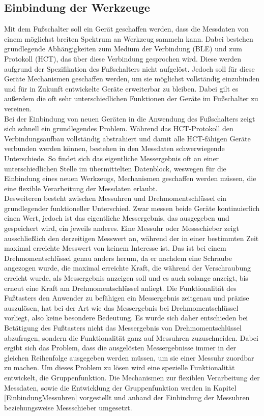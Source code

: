\subsection{Einbindung der Werkzeuge}
Mit dem Fußschalter soll ein Gerät geschaffen werden, dass die Messdaten von einem möglichst breiten Spektrum an Werkzeug sammeln kann. Dabei bestehen grundlegende Abhängigkeiten zum Medium der Verbindung (\ac{BLE}) und zum Protokoll (\ac{HCT}), das über diese Verbindung gesprochen wird. Diese werden aufgrund der Spezifikation des Fußschalters nicht aufgelöst. Jedoch soll für diese Geräte Mechanismen geschaffen werden, um sie möglichst vollständig einzubinden und für in Zukunft entwickelte Geräte erweiterbar zu bleiben. Dabei gilt es außerdem die oft sehr unterschiedlichen Funktionen der Geräte im Fußschalter zu vereinen.\\
Bei der Einbindung von neuen Geräten in die Anwendung des Fußschalters zeigt sich schnell ein grundlegendes Problem. Während das \ac{HCT}-Protokoll den Verbindungsaufbau vollständig abstrahiert und damit alle \ac{HCT}-fähigen Geräte verbunden werden können, bestehen in den Messdaten schwerwiegende Unterschiede. So findet sich das eigentliche Messergebnis oft an einer unterschiedlichen Stelle im übermittelten Datenblock, weswegen für die Einbindung eines neuen Werkzeugs, Mechanismen geschaffen werden müssen, die eine flexible Verarbeitung der Messdaten erlaubt.\\
Desweiteren besteht zwischen Messuhren und Drehmomentschlüssel ein grundlegender funktioneller Unterschied. Zwar messen beide Geräte kontinuierlich einen Wert, jedoch ist das eigentliche Messergebnis, das ausgegeben und gespeichert wird, ein jeweils anderes. Eine Messuhr oder Messschieber zeigt ausschließlich den derzeitigen Messwert an, während der in einer bestimmten Zeit maximal erreichte Messwert von keinem Interesse ist. Das ist bei einem Drehmomentschlüssel genau anders herum, da er nachdem eine Schraube angezogen wurde, die maximal erreichte Kraft, die während der Verschraubung erreicht wurde, als Messergebnis anzeigen soll und es auch solange anzeigt, bis erneut eine Kraft am Drehmomentschlüssel anliegt. 
Die Funktionalität des Fußtasters den Anwender zu befähigen ein Messergebnis zeitgenau und präzise auszulösen, hat bei der Art wie das Messergebnis bei Drehmomentschlüssel vorliegt, also keine besondere Bedeutung. Es wurde sich daher entschieden bei Betätigung des Fußtasters nicht das Messergebnis von Drehmomentschlüssel abzufragen, sondern die Funktionalität ganz auf Messuhren zuzuschneiden. Dabei ergibt sich das Problem, dass die ausgelösten Messergebnisse immer in der gleichen Reihenfolge ausgegeben werden müssen, um sie einer Messuhr zuordbar zu machen. Um dieses Problem zu lösen wird eine spezielle Funktionalität entwickelt, die Gruppenfunktion. Die Mechanismen zur flexiblen Verarbeitung der Messdaten, sowie die Entwicklung der Gruppenfunktion werden in Kapitel \ref{EinbindungMessuhren} vorgestellt und anhand der Einbindung der Messuhren beziehungsweise Messschieber umgesetzt.

